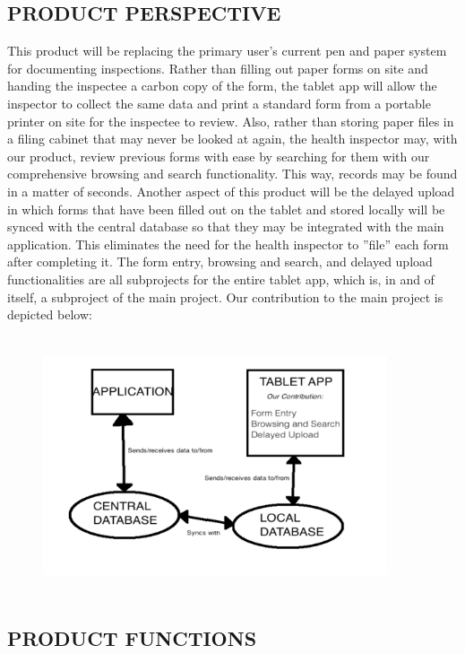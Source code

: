 \documentclass[twoside,letterpaper]{article}
\begin{document}
\subsection[PRODUCT
PERSPECTIVE]{\rmfamily\bfseries\color{black}
PRODUCT PERSPECTIVE}
This product will be replacing the primary user's current pen and paper system for documenting inspections. Rather than filling out paper forms on site and handing the inspectee a carbon copy of the form, the tablet app will allow the inspector to collect the same data and print a standard form from a portable printer on site for the inspectee to review. Also, rather than storing paper files in a filing cabinet that may never be looked at again, the health inspector may, with our product, review previous forms with ease by searching for them with our comprehensive browsing and search functionality. This way, records may be found in a matter of seconds. Another aspect of this product will be the delayed upload in which forms that have been filled out on the tablet and stored locally will be synced with the central database so that they may be integrated with the main application. This eliminates the need for the health inspector to ''file'' each form after completing it.
\newline
The form entry, browsing and search, and delayed upload functionalities are all subprojects for the entire tablet app, which is, in and of itself, a subproject of the main project. Our contribution to the main project is depicted below:

\begin{figure}[H]
\centering
\includegraphics[width=4in,height=3in]{Diagram1.png}
\end{figure}


\subsection[PRODUCT
FUNCTIONS]{\rmfamily\bfseries\color{black}
PRODUCT FUNCTIONS}
\end{document}
